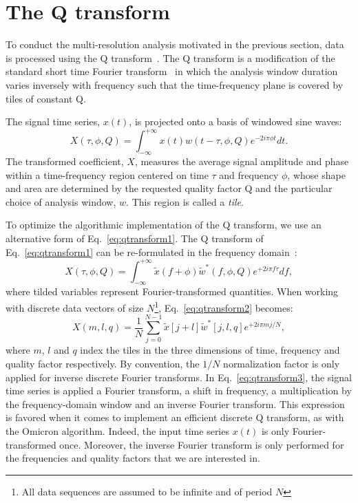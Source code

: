 \section{The Q transform} \label{sec:qtransform}
To conduct the multi-resolution analysis motivated in the previous section, data is processed using the Q transform~\cite{Brown:1991}. The Q transform is a modification of the standard short time Fourier transform~\cite{Gabor:1946} in which the analysis window duration varies inversely with frequency such that the time-frequency plane is covered by tiles of constant Q.

The signal time series, $x(t)$, is projected onto a basis of windowed sine waves:
\begin{equation}
  X(\tau, \phi, Q) = \int_{-\infty}^{+\infty}{ x(t) w(t-\tau,\phi,Q) e^{-2i\pi\phi t}dt}.
  \label{eq:qtransform1}
\end{equation}
The transformed coefficient, $X$, measures the average signal amplitude and phase within a time-frequency region centered on time $\tau$ and frequency $\phi$, whose shape and area are determined by the requested quality factor Q and the particular choice of analysis window, $w$. This region is called a \textit{tile}.

To optimize the algorithmic implementation of the Q transform, we use an alternative form of Eq.~\ref{eq:qtransform1}. The Q transform of Eq.~\ref{eq:qtransform1} can be re-formulated in the frequency domain~\cite{Chatterji:2004}:
\begin{equation}
  X(\tau, \phi, Q) = \int_{-\infty}^{+\infty}{ \tilde{x}(f+\phi) \tilde{w}^{*}(f,\phi,Q) e^{+2i\pi f \tau}df},
  \label{eq:qtransform2}
\end{equation}
where tilded variables represent Fourier-transformed quantities. When working with discrete data vectors of size $N$\footnote{All data sequences are assumed to be infinite and of period $N$}, Eq.~\ref{eq:qtransform2} becomes:
\begin{equation}
  X(m,l,q) = \frac{1}{N}\sum_{j=0}^{N-1}{\tilde{x}[j+l]\tilde{w}^{*}[j,l,q]e^{+2i\pi mj/N}},
  \label{eq:qtransform3}
\end{equation}
where $m$, $l$ and $q$ index the tiles in the three dimensions of time, frequency and quality factor respectively. By convention, the $1/N$ normalization factor is only applied for inverse discrete Fourier transforms. In Eq.~\ref{eq:qtransform3}, the signal time series is applied a Fourier transform, a shift in frequency, a multiplication by the frequency-domain window and an inverse Fourier transform. This expression is favored when it comes to implement an efficient discrete Q transform, as with the Omicron algorithm. Indeed, the input time series $x(t)$ is only Fourier-transformed once. Moreover, the inverse Fourier transform is only performed for the frequencies and quality factors that we are interested in.

